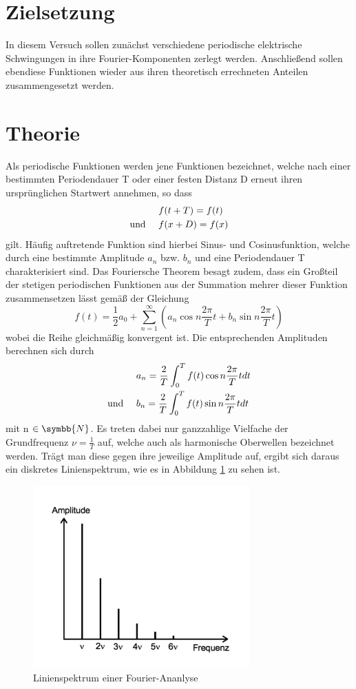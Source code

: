 
\section{Zielsetzung}
In diesem Versuch sollen zunächst verschiedene periodische elektrische
Schwingungen in ihre Fourier-Komponenten zerlegt werden. Anschließend sollen
ebendiese Funktionen wieder aus ihren theoretisch errechneten Anteilen
zusammengesetzt werden.

\section{Theorie}
Als periodische Funktionen werden jene Funktionen bezeichnet, welche nach
einer bestimmten Periodendauer T oder einer festen Distanz D erneut ihren
ursprünglichen Startwert annehmen, so dass
\begin{align}
  & f(t+T)=f(t) \\
  \text{und \quad}      & f(x+D)=f(x)
  \label{eqn:period}
\end{align}
gilt. Häufig auftretende Funktion sind hierbei Sinus- und Cosinusfunktion,
welche durch eine bestimmte Amplitude $a_n$ bzw. $b_n$ und eine Periodendauer T
charakterisiert sind.
Das Fouriersche Theorem besagt zudem, dass ein Großteil der stetigen periodischen
Funktionen aus der Summation mehrer dieser Funktion zusammensetzen lässt gemäß
der Gleichung
\begin{equation}
   f(t)= \frac{1}{2}a_0 + \sum_{n=1}^\infty \left(a_n \cos n \frac{2 \pi}{T}t
   + b_n \sin n \frac{2 \pi}{T}t\right)
\end{equation}
wobei die Reihe gleichmäßig konvergent ist. Die entsprechenden Amplituden
berechnen sich durch
\begin{align}
  & a_n = \frac{2}{T} \int_0^T f(t) \cos n \frac{2 \pi}{T}t dt \\
  \text{und \quad}     & b_n = \frac{2}{T} \int_0^T f(t) \sin n \frac{2 \pi}
  {T}t dt
\end{align}
mit n $\in \symbb{N} $. Es treten dabei nur ganzzahlige Vielfache der
Grundfrequenz $\nu = \frac{1}{T} $ auf, welche auch als harmonische Oberwellen
bezeichnet werden. Trägt man diese gegen ihre jeweilige Amplitude auf, ergibt
sich daraus ein diskretes Linienspektrum, wie es in Abbildung
\ref{fig:spektrum} zu sehen ist.
\begin{figure}[H]
  \centering
  \includegraphics[height=7cm]{Spektrum.png}
  \caption{Linienspektrum einer Fourier-Ananlyse \cite{skript}}
  \label{fig:spektrum}
\end{figure}
